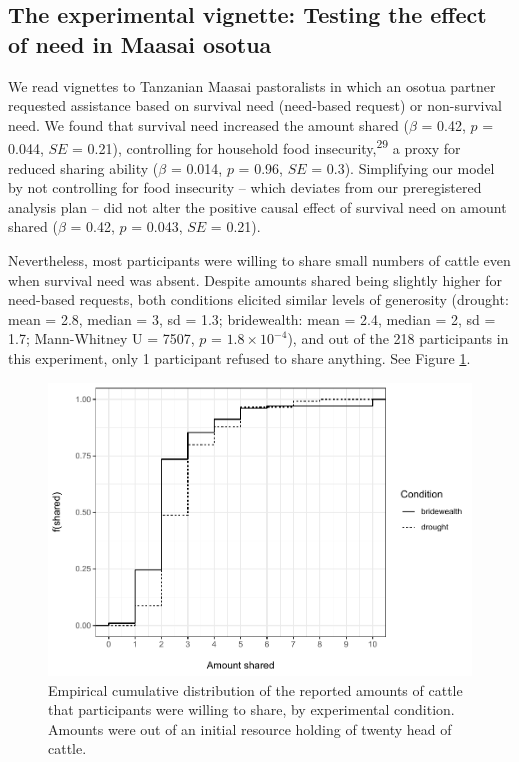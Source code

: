 \documentclass[
]{article}
\begin{document}
\subsection*{The experimental vignette: Testing the effect of need in Maasai osotua}\label{experiment}

We read vignettes to Tanzanian Maasai pastoralists in which an osotua partner requested assistance based on survival need (need-based request) or non-survival need. We found that survival need increased the amount shared (\(\beta\) = 0.42, \(p\) = 0.044, \(SE\) = 0.21), controlling for household food insecurity,\textsuperscript{29} a proxy for reduced sharing ability (\(\beta\) = 0.014, \(p\) = 0.96, \(SE\) = 0.3). Simplifying our model by not controlling for food insecurity -- which deviates from our preregistered analysis plan -- did not alter the positive causal effect of survival need on amount shared (\(\beta\) = 0.42, \(p\) = 0.043, \(SE\) = 0.21).

Nevertheless, most participants were willing to share small numbers of cattle even when survival need was absent. Despite amounts shared being slightly higher for need-based requests, both conditions elicited similar levels of generosity (drought: mean = 2.8, median = 3, sd = 1.3; bridewealth: mean = 2.4, median = 2, sd = 1.7; Mann-Whitney U = 7507, \(p\) = \ensuremath{1.8\times 10^{-4}}), and out of the 218 participants in this experiment, only 1 participant refused to share anything. See Figure \ref{fig:amtshareplot}.

\begin{figure}
\centering
\includegraphics{needBasedSharing-paper_files/figure-latex/amtshareplot-1.pdf}
\caption{\label{fig:amtshareplot}Empirical cumulative distribution of the reported amounts of cattle that participants were willing to share, by experimental condition. Amounts were out of an initial resource holding of twenty head of cattle.}
\end{figure}
\end{document}
